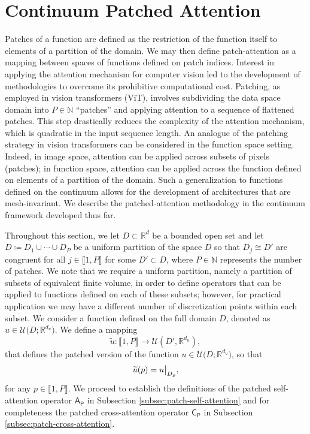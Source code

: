 \documentclass[twoside]{article}
\newcommand{\1}{\mathbbm{1}}
\newcommand{\R}{\mathbbm{R}}
\newcommand{\cU}{\mathcal{U}}
\newcommand{\sAp}{\mathsf{A}_{\mathsf{P}}}
\newcommand{\sCp}{\mathsf{C}_{\mathsf{P}}}
\newcommand{\range}[2]{\llbracket #1, #2 \rrbracket}
\providecommand{\mathbbm}{\mathbb} %
\newcommand\restr[2]{{%
  \left.\kern-\nulldelimiterspace %
  #1 %
  \littletaller %
  \right|_{#2} %
  }}
\newcommand{\littletaller}{\mathchoice{\vphantom{\big|}}{}{}{}}
\begin{document}
\section{Continuum Patched Attention}
\label{sec:patch_attention}

Patches of a function are defined as the restriction of the function itself to elements of a partition of the domain. We may then define patch-attention as a mapping between spaces of functions defined on patch indices.  
Interest in applying the attention mechanism for computer vision led to the development of methodologies to overcome its prohibitive computational cost. Patching, as employed in vision transformers (ViT), involves subdividing the data space domain into $P\in \mathbb{N}$ ``patches'' and applying attention to a sequence of flattened patches. This step drastically reduces the complexity of the attention mechanism, which is quadratic in the input sequence length. An analogue of the patching strategy in vision transformers can be considered in the function space setting. Indeed, in image space, attention can be applied across subsets of pixels (patches); in function space, attention can be applied across the function defined on elements of a partition of the domain. Such a generalization to functions defined on the continuum allows for the development of architectures that are mesh-invariant. We describe the patched-attention methodology in the continuum framework developed thus far. 

Throughout this section, we let $D\subset\R^d$ be a bounded open set and let $D\coloneqq D_1 \cup \cdots \cup D_P$ be a uniform partition of the space $D$ so that $D_j\cong D'$ {are congruent} for all $j\in\range{1}{P}$ for some $D'\subset D$, where $P\in\mathbb{N}$ represents the number of patches. We note that we require a uniform partition, namely a partition of subsets of equivalent finite volume, in order to define operators that can be applied to functions defined on each of these subsets; however, for practical application we may have a different number of discretization points within each subset. %
We consider a function defined on the full domain $D$, denoted as $u\in \cU\bigl( D; \R^{d_u} \bigr)$. We define a mapping 
\begin{equation}
\widetilde{u}:\range{1}{P} \to \cU(D' ,\mathbb{R}^{d_u}),
\end{equation}
that defines the patched version of the function $u\in \cU\bigl( D; \R^{d_u} \bigr)$, so that
\begin{equation}
\widetilde{u}(p)= \restr{u}{D_p},
\end{equation}
for any $p\in\range{1}{P}$. We proceed to establish the definitions of the patched self-attention operator $\sAp$ in Subsection \ref{subsec:patch-self-attention} and for completeness the patched cross-attention operator $\sCp$ in Subsection \ref{subsec:patch-cross-attention}.
\end{document}
